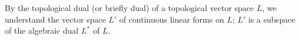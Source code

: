 By the topological dual (or briefly dual) of a topological vector space $L$, we understand the vector space $L'$ of continuous linear forms on $L$; $L'$ is a subspace of the algebraic dual $L^*$ of $L$.
